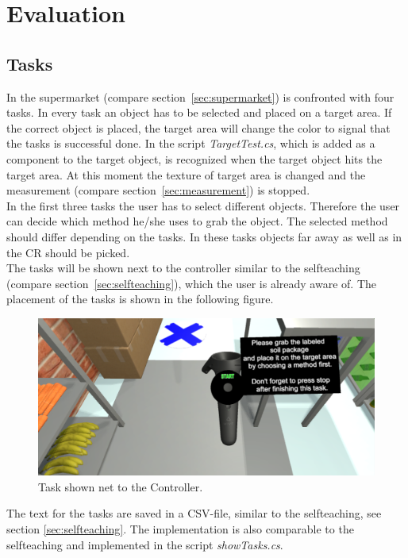 \section{Evaluation} \label{sec:evaluation}

\subsection{Tasks} \label{sec:tasks}
In the supermarket (compare section~\ref{sec:supermarket}) is confronted with four tasks. In every task an object has to be selected and placed on a target area. If the correct object is placed, the target area will change the color to signal that the tasks is successful done. In the script \textit{TargetTest.cs}, which is added as a component to the target object, is recognized when the target object hits the target area. At this moment the texture of target area is changed and the measurement (compare section~\ref{sec:measurement}) is stopped. \\
In the first three tasks the user has to select different objects. Therefore the user can decide which method he/she uses to grab the object. The selected method should differ depending on the tasks. In these tasks objects far away as well as in the CR should be picked. \\
The tasks will be shown next to the controller similar to the selfteaching (compare section~\ref{sec:selfteaching}), which the user is already aware of. The placement of the tasks is shown in the following figure. 

\begin{figure}[H] 
	\center 
	\includegraphics[width=12cm]{Images/TaskContreoller.PNG}
	\caption[Task shown next to the Controller.]{Task shown net to the Controller.}
	\label{fig:taskC}
\end{figure} 

The text for the tasks are saved in a CSV-file, similar to the selfteaching, see section \ref{sec:selfteaching}. The implementation is also comparable to the selfteaching and implemented in the script \textit{showTasks.cs}.

